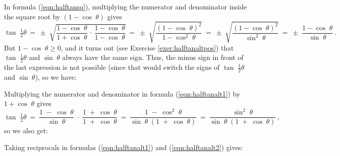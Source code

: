 In formula (\ref{eqn:halftansq}), multiplying the numerator and denominator inside the square root
by $(1 - \cos\;\theta)$ gives
\begin{displaymath}
 \tan\;\tfrac{1}{2}\theta ~=~ \pm\;\sqrt{\frac{1 - \cos\;\theta}{1 + \cos\;\theta} \,\cdot\,
  \frac{1 - \cos\;\theta}{1 - \cos\;\theta}} ~=~
   \pm\;\sqrt{\frac{(1 - \cos\;\theta)^2}{1 - \cos^2 \;\theta}} ~=~
   \pm\;\sqrt{\frac{(1 - \cos\;\theta)^2}{\sin^2 \;\theta}} ~=~ \pm\;\frac{1 - \cos\;\theta}{\sin\;\theta} ~.
\end{displaymath}
But $1 - \cos\;\theta \ge 0$, and it turns out (see Exercise \ref{exer:halftanaltpos})
that $\tan\;\tfrac{1}{2}\theta$ and $\sin\;\theta$ always have the same sign.
Thus, the minus sign in front of the last expression is not possible (since that would switch the
signs of $\tan\;\tfrac{1}{2}\theta$ and $\sin\;\theta$), so we have:

\begin{center}\end{center}

\noindent Multiplying the numerator and denominator in formula (\ref{eqn:halftanalt1}) by
$1 + \cos\;\theta$ gives
\begin{displaymath}
 \tan\;\tfrac{1}{2}\theta ~=~ \frac{1 \;-\; \cos\;\theta}{\sin\;\theta} \;\cdot\;
  \frac{1 \;+\; \cos\;\theta}{1 \;+\; \cos\;\theta} ~=~ \frac{1 \;-\; \cos^2 \;\theta}{\sin\;\theta\;(1 \;+\; \cos\;\theta)}
  ~=~ \frac{\sin^2 \;\theta}{\sin\;\theta\;(1 \;+\; \cos\;\theta)} ~,
\end{displaymath}
so we also get:

\begin{center}\end{center}

\noindent Taking reciprocals in formulas (\ref{eqn:halftanalt1}) and (\ref{eqn:halftanalt2}) gives:

